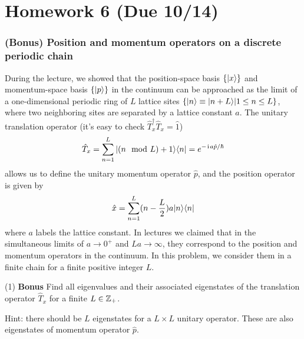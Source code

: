 \chapter{Homework 6 (Due 10/14)}

\subsection{(Bonus) Position and momentum operators on a discrete periodic chain}

During the lecture, we showed that the position-space basis $\{|{x}\rangle\}$ and momentum-space basis $\{|{p}\rangle\}$ in the continuum can be approached as the limit of a one-dimensional periodic ring of $L$ lattice sites $\{|{n}\rangle\equiv|{n+L}\rangle|1\leq n\leq L\}$, where two neighboring sites are separated by a lattice constant $a$. The unitary translation operator (it's easy to check $\hat T_x^\dagger\hat T_x=\hat1$)
\begin{align}\label{momentum:finite L}
\hat T_x=\sum_{n=1}^{L}|{(n\mod L)+1}\rangle\langle{n}|=e^{-\hspace{1pt}\mathrm{i}\hspace{1pt} a\hat p/\hbar}
\end{align}
allows us to define the unitary momentum operator $\hat p$, and the position operator is given by
\begin{align}\label{position:finite L}
\hat x=\sum_{n=1}^{L}(n-\frac{L}2)a|{n}\rangle\langle{n}|
\end{align}
where $a$ labels the lattice constant. In lectures we claimed that in the simultaneous limits of $a\rightarrow0^+$ and $La\rightarrow\infty$, they correspond to the position and momentum operators in the continuum. In this problem, we consider them in a finite chain for a finite positive integer $L$. 

(1) \textbf{Bonus} Find all eigenvalues and their associated eigenstates of the translation operator $\hat T_x$ for a finite $L\in{\mathbb{Z}}_+$.

Hint: there should be $L$ eigenstates for a $L\times L$ unitary operator. These are also eigenstates of momentum operator $\hat p$. 




